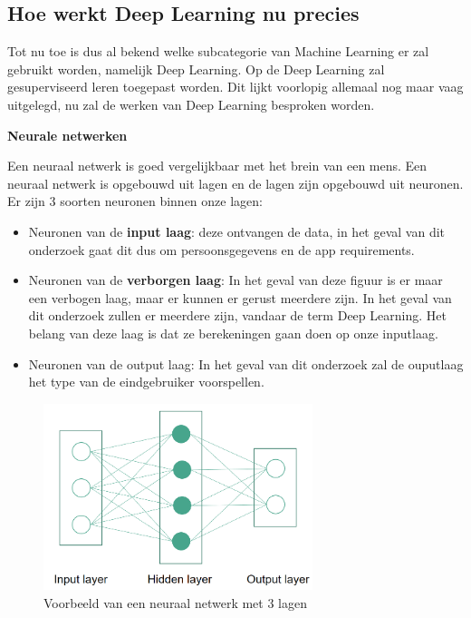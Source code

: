 \subsection{Hoe werkt Deep Learning nu precies}

Tot nu toe is dus al bekend welke subcategorie van Machine Learning er zal gebruikt worden, namelijk Deep Learning. Op de Deep Learning zal gesuperviseerd leren toegepast worden. Dit lijkt voorlopig allemaal nog maar vaag uitgelegd, nu zal de werken van Deep Learning besproken worden.

\textbf{Neurale netwerken}

Een neuraal netwerk is goed vergelijkbaar met het brein van een mens. Een neuraal netwerk is opgebouwd uit lagen en de lagen zijn opgebouwd uit neuronen. Er zijn 3 soorten neuronen binnen onze lagen:

\begin{itemize}
\setlength\itemsep{1.5em}
    \item  Neuronen van de \textbf{input laag}: deze ontvangen de data, in het geval van dit onderzoek gaat dit dus om persoonsgegevens en de app requirements.
    \item Neuronen van de \textbf{verborgen laag}: In het geval van deze figuur is er maar een verbogen laag, maar er kunnen er gerust meerdere zijn. In het geval van dit onderzoek zullen er meerdere zijn, vandaar de term Deep Learning. Het belang van deze laag is dat ze berekeningen gaan doen op onze inputlaag. 
    \item Neuronen van de output laag: In het geval van dit onderzoek zal de ouputlaag het type van de eindgebruiker voorspellen. 
\end{itemize}

\newpage
\begin{figure}[h!]
\centering
\includegraphics[width=0.7\textwidth]{bachproef/img/neuraalnetwerk.png}
\caption{Voorbeeld van een neuraal netwerk met 3 lagen}
\end{figure}

